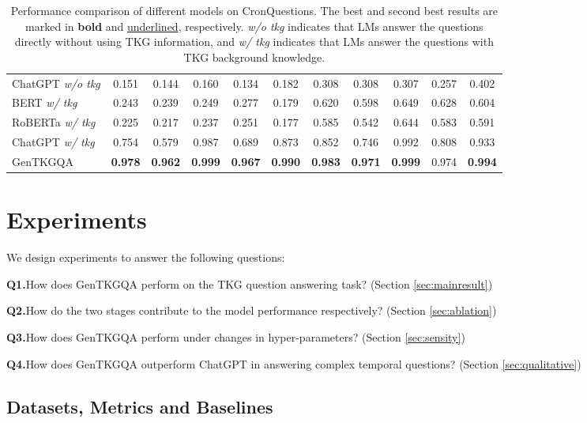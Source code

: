 \documentclass[11pt]{article}
\begin{document}
\begin{table}[ht]
{\begin{tabular}{l|c|c|c|c|c|c|c|c|c|c}
    ChatGPT \textit{w/o tkg} & 0.151  & 0.144 & 0.160 & 0.134 &0.182  & 0.308 & 0.308 & 0.307 & 0.257 & 0.402\\
    \cline{1-11}
    BERT \textit{w/ tkg} & 0.243 & 0.239 & 0.249 & 0.277 & 0.179 & 0.620 & 0.598 & 0.649 & 0.628 & 0.604\\
    RoBERTa \textit{w/ tkg} & 0.225 & 0.217 & 0.237 & 0.251 & 0.177 & 0.585 & 0.542 & 0.644 & 0.583 & 0.591\\
    ChatGPT \textit{w/ tkg} & 0.754  & 0.579 & 0.987 & 0.689 &0.873&0.852  & 0.746 & 0.992 & 0.808 & 0.933\\
    \cline{1-11}
    GenTKGQA & \textbf{0.978}&\textbf{0.962}&\textbf{0.999}&\textbf{0.967}&\textbf{0.990}&\textbf{0.983}&\textbf{0.971}&\textbf{0.999}&0.974&\textbf{0.994}\\
    \bottomrule
    \end{tabular}}
    \caption{Performance comparison of different models on CronQuestions. The best and second best results are marked in \textbf{bold} and \underline{underlined}, respectively.
    \textit{w/o tkg} indicates that LMs answer the questions directly without using TKG information, and \textit{w/ tkg} indicates that LMs answer the questions with TKG background knowledge.}
\label{tab:main result}
\end{table}


\section{Experiments}

We design experiments to answer the following questions: 

\textbf{Q1.}How does GenTKGQA perform on the TKG question answering task? (Section \ref{sec:mainresult})

\textbf{Q2.}How do the two stages contribute to the model performance respectively? (Section \ref{sec:ablation})

\textbf{Q3.}How does GenTKGQA perform under changes in hyper-parameters? (Section \ref{sec:sensity})

\textbf{Q4.}How does GenTKGQA outperform ChatGPT in answering complex temporal questions? (Section \ref{sec:qualitative})

\subsection{Datasets, Metrics and Baselines}
\end{document}
